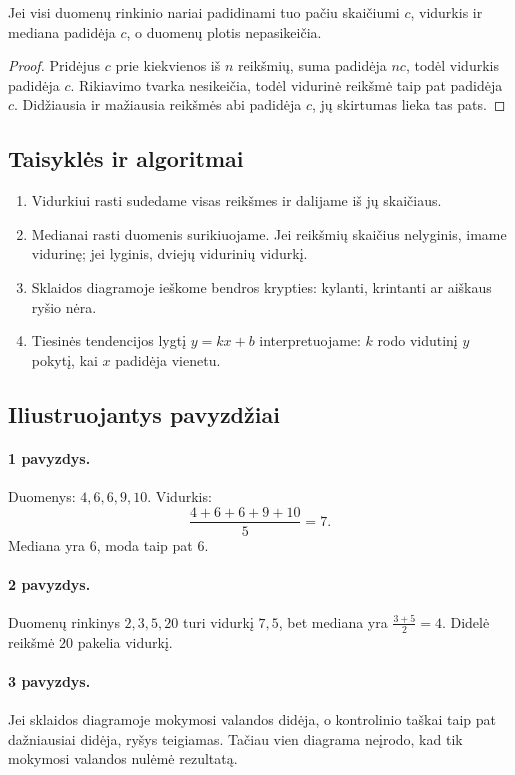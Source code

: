 \begin{teorema}
Jei visi duomenų rinkinio nariai padidinami tuo pačiu skaičiumi $c$, vidurkis ir mediana padidėja $c$, o duomenų plotis nepasikeičia.
\end{teorema}
\begin{proof}
Pridėjus $c$ prie kiekvienos iš $n$ reikšmių, suma padidėja $nc$, todėl vidurkis padidėja $c$. Rikiavimo tvarka nesikeičia, todėl vidurinė reikšmė taip pat padidėja $c$. Didžiausia ir mažiausia reikšmės abi padidėja $c$, jų skirtumas lieka tas pats.
\end{proof}

\subsection{Taisyklės ir algoritmai}

\begin{enumerate}
\item Vidurkiui rasti sudedame visas reikšmes ir dalijame iš jų skaičiaus.
\item Medianai rasti duomenis surikiuojame. Jei reikšmių skaičius nelyginis, imame vidurinę; jei lyginis, dviejų vidurinių vidurkį.
\item Sklaidos diagramoje ieškome bendros krypties: kylanti, krintanti ar aiškaus ryšio nėra.
\item Tiesinės tendencijos lygtį $y=kx+b$ interpretuojame: $k$ rodo vidutinį $y$ pokytį, kai $x$ padidėja vienetu.
\end{enumerate}

\subsection{Iliustruojantys pavyzdžiai}

\paragraph{1 pavyzdys.}
Duomenys: $4,6,6,9,10$. Vidurkis:
\[
\frac{4+6+6+9+10}{5}=7.
\]
Mediana yra $6$, moda taip pat $6$.

\paragraph{2 pavyzdys.}
Duomenų rinkinys $2,3,5,20$ turi vidurkį $7,5$, bet mediana yra $\frac{3+5}{2}=4$. Didelė reikšmė $20$ pakelia vidurkį.

\paragraph{3 pavyzdys.}
Jei sklaidos diagramoje mokymosi valandos didėja, o kontrolinio taškai taip pat dažniausiai didėja, ryšys teigiamas. Tačiau vien diagrama neįrodo, kad tik mokymosi valandos nulėmė rezultatą.

